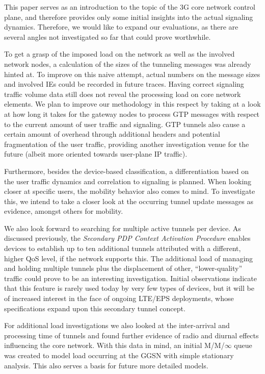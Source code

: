 This paper serves as an introduction to the topic of the 3G core network control plane, and therefore provides only some initial insights into the actual signaling dynamics. Therefore, we would like to expand our evaluations, as there are several  angles not investigated so far that could prove worthwhile.

To get a grasp of the imposed load on the network as well as the involved network nodes, a calculation of the sizes of the tunneling messages was already hinted at. To improve on this naive attempt, actual numbers on the message sizes and involved \glspl{IE} could be recorded in future traces. Having correct signaling traffic volume data still does not reveal the processing load on core network elements. We plan to improve our methodology in this respect by taking at a look at how long it takes for the gateway nodes to process \gls{GTP} messages with respect to the current amount of user traffic and signaling. \gls{GTP} tunnels also cause a certain amount of overhead through additional headers and potential fragmentation of the user traffic, providing another investigation venue for the future (albeit more oriented towards user-plane IP traffic). 

Furthermore, besides the device-based classification, a differentiation based on the user traffic dynamics and correlation to signaling is planned. When looking closer at specific users, the mobility behavior also comes to mind. To investigate this, we intend to take a closer look at the occurring tunnel update messages as evidence, amongst others for mobility.

We also look forward to searching for multiple active tunnels per device. As discussed previously, the \textit{Secondary PDP Context Activation Procedure} enables devices to establish up to ten additional tunnels attributed with a different, higher QoS level, if the network supports this. The additional load of managing and holding multiple tunnels plus the displacement of other, ``lower-quality'' traffic could prove to be an interesting investigation. Initial observations indicate that this feature is rarely used today by very few types of devices, but it will be of increased interest in the face of ongoing LTE/EPS deployments, whose specifications expand upon this secondary tunnel concept.

For additional load investigations we also looked at the inter-arrival and processing time of tunnels and found further evidence of radio and diurnal effects influencing the core network. With this data in mind, an initial M/M/$\infty$ queue was created to model load occurring at the \gls{GGSN} with simple stationary analysis. This also serves a basis for future more detailed models.

